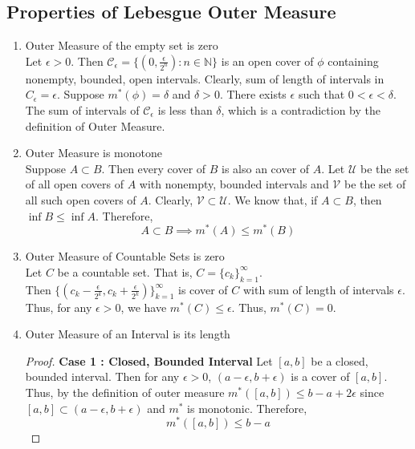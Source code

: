 \subsection{Properties of Lebesgue Outer Measure}
\begin{enumerate}
	\item Outer Measure of the empty set is zero\\
	Let $\epsilon > 0$.
	Then $\mathcal{C}_\epsilon = \{ (0,\frac{\epsilon}{2^n}) : n \in \mathbb{N} \}$ is an open cover of $\phi$ containing nonempty, bounded, open intervals.
	Clearly, sum of length of intervals in $C_\epsilon = \epsilon$.
	Suppose $m^\ast(\phi) = \delta$ and $\delta > 0$.
	There exists $\epsilon$ such that $0 < \epsilon < \delta$.
	The sum of intervals of $\mathcal{C}_\epsilon$ is less than $\delta$, which is a contradiction by the definition of Outer Measure.
	\item Outer Measure is monotone\\
	Suppose $A \subset B$.
	Then every cover of $B$ is also an  cover of $A$.
	Let $\mathcal{U}$ be the set of all open covers of $A$ with nonempty, bounded intervals and $\mathcal{V}$ be the set of all such open covers of $A$.
	Clearly, $\mathcal{V} \subset \mathcal{U}$.
	We know that, if $A \subset B$, then $\inf{B} \le \inf{A}$.
	Therefore,
	\begin{equation}
		A \subset B \implies m^\ast(A) \le m^\ast(B)
	\end{equation}
	\item Outer Measure of Countable Sets is zero\\
	Let $C$ be a countable set.
	That is, $C = \{ c_k \}_{k=1}^\infty$.\\
	Then $\{ (c_k-\frac{\epsilon}{2^k}, c_k + \frac{\epsilon}{2^k}) \}_{k=1}^\infty$ is cover of $C$ with sum of length of intervals $\epsilon$.
	Thus, for any $\epsilon > 0$, we have $m^\ast(C) \le \epsilon$.
	Thus, $m^\ast(C) = 0$.
	\item Outer Measure of an Interval is its length
	\begin{proof}
		\textbf{Case 1 : Closed, Bounded Interval}
		Let $[a,b]$ be a closed, bounded interval.
		Then for any $\epsilon > 0$, $(a-\epsilon,b+\epsilon)$ is a cover of $[a,b]$.
		Thus, by the definition of outer measure $m^\ast([a,b]) \le b-a+2\epsilon$ since $[a,b] \subset (a-\epsilon,b+\epsilon)$ and $m^\ast$ is monotonic.
		Therefore,
	\begin{equation}
		m^\ast([a,b]) \le b-a
	\end{equation}


\end{proof}
\end{enumerate}
